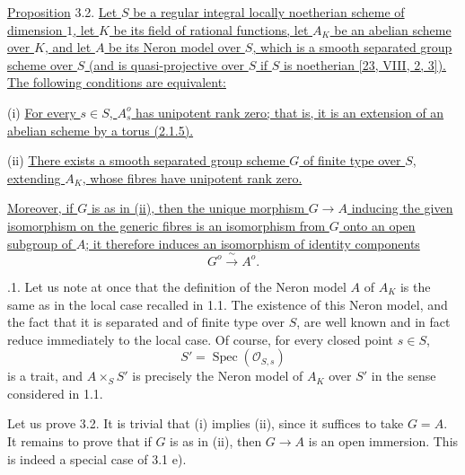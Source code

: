 
\medskip
\noindent
\underline{Proposition} 3.2. \underline{Let $S$ be a regular integral
locally noetherian scheme of dimension $1$, let $K$ be its field of rational
functions, let $A_K$ be an abelian scheme over $K$, and let $A$ be its Neron
model over $S$, which is a smooth separated group scheme over $S$ (and is
quasi-projective over $S$ if $S$ is noetherian [23, VIII, 2, 3\textdegree]).
The following conditions are equivalent:}

\smallskip
\noindent
(i) \underline{For every $s\in S$, $A_s^o$ has unipotent rank zero; that is,
it is an extension of an abelian scheme by a torus (2.1.5).}

\smallskip
\noindent
(ii) \underline{There exists a smooth separated group scheme $G$ of finite
type over $S$, extending $A_K$, whose fibres have unipotent rank zero.}

\smallskip
\noindent
\underline{Moreover, if $G$ is as in (ii), then the unique morphism
$G\longrightarrow A$ inducing the given isomorphism on the generic fibres
is an isomorphism from $G$ onto an open subgroup of $A$; it therefore induces
an isomorphism of identity components}
\[
 G^o\xrightarrow{\ \sim\ }A^o.
\]

\medskip
{}.1.  Let us note at once that the definition of the Neron model $A$ of
$A_K$ is the same as in the local case recalled in 1.1.  The existence of
this Neron model, and the fact that it is separated and of finite type over
$S$, are well known and in fact reduce immediately to the local case.  Of
course, for every closed point $s\in S$,
\[
 S'=\operatorname{Spec}(\mathcal O_{S,s})
\]
is a trait, and $A\times_S S'$ is precisely the Neron model of $A_K$ over
$S'$ in the sense considered in 1.1.

Let us prove 3.2.  It is trivial that (i) implies (ii), since it suffices to
take $G=A$.  It remains to prove that if $G$ is as in (ii), then
$G\longrightarrow A$ is an open immersion.  This is indeed a special case
of 3.1 e).

